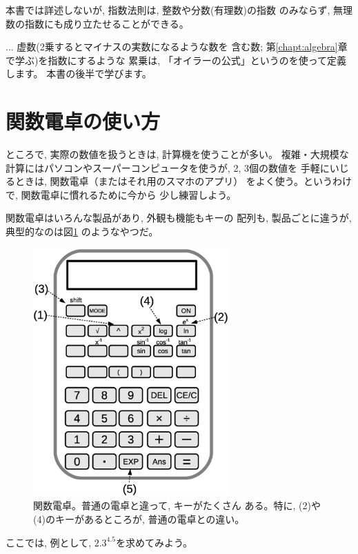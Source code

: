 本書では詳述しないが, 指数法則は, 整数や分数(有理数)の指数
のみならず, 無理数の指数にも成り立たせることができる。

\begin{faq}{\small{}
... 虚数(2乗するとマイナスの実数になるような数を
含む数; 第\ref{chapt:algebra}章で学ぶ)を指数にするような
累乗は, 「オイラーの公式」というのを使って定義します。
本書の後半で学びます。}\end{faq}
\mv



\section{関数電卓の使い方}\label{sec:calculator}

ところで, 実際の数値を扱うときは, 計算機を使うことが多い。
複雑・大規模な計算にはパソコンやスーパーコンピュータを使うが, 2, 3個の数値を
手軽にいじるときは, 関数電卓（またはそれ用のスマホのアプリ）
をよく使う。というわけで, 関数電卓に慣れるために今から
少し練習しよう。

関数電卓はいろんな製品があり, 外観も機能もキーの
配列も, 製品ごとに違うが, 典型的なのは図\ref{fig:calculator}
のようなやつだ。
\begin{figure}[h]
    \centering
    \includegraphics[width=7.5cm]{calculator.eps}
    \caption{関数電卓。普通の電卓と違って, キーがたくさん
ある。特に, (2)や(4)のキーがあるところが, 普通の電卓との違い。}\label{fig:calculator}
\end{figure}
ここでは, 例として, 
$2.3^{4.5}$を求めてみよう。

